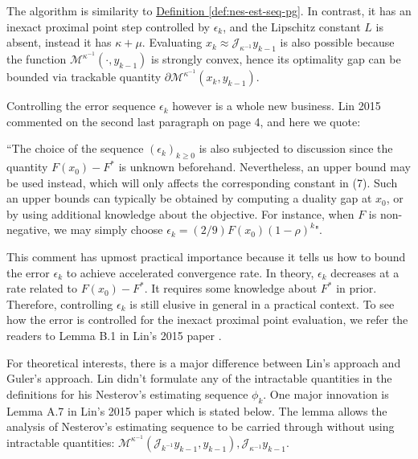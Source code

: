 \documentclass[12pt]{article}
\begin{document}
    \begin{remark}
        The algorithm is similarity to
        \hyperref[def:nes-est-seq-pg]{Definition \ref*{def:nes-est-seq-pg}}. 
        In contrast, it has an inexact proximal point step controlled by $\epsilon_k$, and the Lipschitz constant $L$ is absent, instead it has $\kappa + \mu$. 
        Evaluating $x_k \approx \mathcal J_{\kappa^{-1}}y_{k - 1}$ is also possible because the function $\mathcal M^{\kappa^{-1}}(\cdot, y_{k - 1})$ is strongly convex, hence its optimality gap can be bounded via trackable quantity $\partial \mathcal M^{\kappa^{-1}}(x_k, y_{k - 1})$. 
        \par
        Controlling the error sequence $\epsilon_k$ however is a whole new business. 
        Lin 2015 \cite{lin_universal_2015} commented on the second last paragraph on page 4, and here we quote:
        \par
        ``The choice of the sequence $(\epsilon_k)_{k \ge 0}$ is also subjected to discussion since the quantity $F(x_0) - F^*$ is unknown beforehand. Nevertheless, an upper bound may be used instead, which will only affects the corresponding constant in (7). Such an upper bounds can typically be obtained by computing a duality gap at $x_0$, or by using additional knowledge about the objective. For instance, when $F$ is non-negative, we may simply choose $\epsilon_k = (2/9)F(x_0)(1 - \rho)^k$". 
        \par
        This comment has upmost practical importance because it tells us how to bound the error $\epsilon_k$ to achieve accelerated convergence rate. 
        In theory, $\epsilon_k$ decreases at a rate related to $F(x_0) - F^*$. 
        It requires some knowledge about $F^*$ in prior. 
        Therefore, controlling $\epsilon_k$ is still elusive in general in a practical context. 
        To see how the error is controlled for the inexact proximal point evaluation, we refer the readers to Lemma B.1 in Lin's 2015 paper \cite{lin_universal_2015}. 
    \end{remark}
    \par
    For theoretical interests, there is a major difference between Lin's approach and Guler's approach. 
    Lin didn't formulate any of the intractable quantities in the definitions for his Nesterov's estimating sequence $\phi_k$. 
    One major innovation is Lemma A.7 in Lin's 2015 paper \cite{lin_universal_2015} which is stated below. 
    The lemma allows the analysis of Nesterov's estimating sequence to be carried through without using intractable quantities: $\mathcal M^{\kappa^{-1}}(\mathcal J_{k^{-1}}y_{k - 1}, y_{k - 1}), \mathcal J_{\kappa^{-1}}y_{k - 1}$. 
\end{document}
